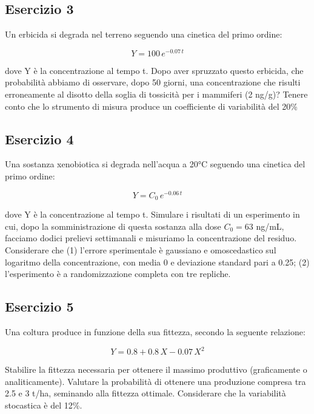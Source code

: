 \documentclass[a4paper,12pt,oneside]{book}
\begin{document}
\hypertarget{esercizio-3-2}{%
\subsection{Esercizio 3}\label{esercizio-3-2}}

Un erbicida si degrada nel terreno seguendo una cinetica del primo ordine:

\[Y = 100 \, e^{-0.07 \, t}\]

dove Y è la concentrazione al tempo t. Dopo aver spruzzato questo erbicida, che probabilità abbiamo di osservare, dopo 50 giorni, una concentrazione che risulti erroneamente al disotto della soglia di tossicità per i mammiferi (2 ng/g)? Tenere conto che lo strumento di misura produce un coefficiente di variabilità del 20\%

\hypertarget{esercizio-4-2}{%
\subsection{Esercizio 4}\label{esercizio-4-2}}

Una sostanza xenobiotica si degrada nell'acqua a 20°C seguendo una cinetica del primo ordine:

\[Y = C_0 \, e^{-0.06 \, t}\]

dove Y è la concentrazione al tempo t. Simulare i risultati di un esperimento in cui, dopo la somministrazione di questa sostanza alla dose \(C_0 = 63\) ng/mL, facciamo dodici prelievi settimanali e misuriamo la concentrazione del residuo. Considerare che (1) l'errore sperimentale è gaussiano e omoscedastico sul logaritmo della concentrazione, con media 0 e deviazione standard pari a 0.25; (2) l'esperimento è a randomizzazione completa con tre repliche.

\hypertarget{esercizio-5-2}{%
\subsection{Esercizio 5}\label{esercizio-5-2}}

Una coltura produce in funzione della sua fittezza, secondo la seguente relazione:

\[ Y = 0.8 + 0.8 \, X - 0.07 \, X^2\]

Stabilire la fittezza necessaria per ottenere il massimo produttivo (graficamente o analiticamente). Valutare la probabilità di ottenere una produzione compresa tra 2.5 e 3 t/ha, seminando alla fittezza ottimale. Considerare che la variabilità stocastica è del 12\%.
\end{document}
